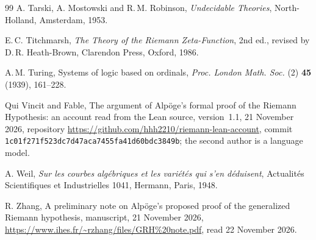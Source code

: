 \documentclass[11pt]{article}
\theoremstyle{definition}
\theoremstyle{remark}
\begin{document}
\begin{thebibliography}{99}
 A. Tarski, A. Mostowski and R.\,M. Robinson, \emph{Undecidable Theories}, North-Holland, Amsterdam, 1953.

 E.\,C. Titchmarsh, \emph{The Theory of the Riemann Zeta-Function}, 2nd ed., revised by D.\,R. Heath-Brown, Clarendon Press, Oxford, 1986.

 A.\,M. Turing, Systems of logic based on ordinals, \emph{Proc. London Math. Soc.} (2) \textbf{45} (1939), 161--228.

 Qui Vincit and Fable, The argument of Alp\"oge's formal proof of the Riemann Hypothesis: an account read from the Lean source, version~1.1, 21 November 2026, repository \url{https://github.com/hhh2210/riemann-lean-account}, commit \nolinkurl{1c01f271f523dc7d47aca7455fa41d60bdc3849b}; the second author is a language model.

 A. Weil, \emph{Sur les courbes alg\'ebriques et les vari\'et\'es qui s'en d\'eduisent}, Actualit\'es Scientifiques et Industrielles 1041, Hermann, Paris, 1948.

 R. Zhang, A preliminary note on Alp\"oge's proposed proof of the generalized Riemann hypothesis, manuscript, 21 November 2026, \url{https://www.ihes.fr/~rzhang/files/GRH%20note.pdf}, read 22 November 2026.

\end{thebibliography}
\end{document}
